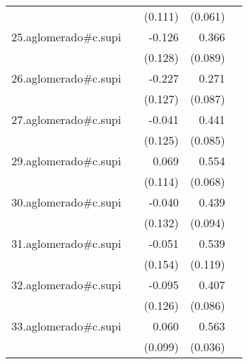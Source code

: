 {\begin{longtable}{l*{4}{D{.}{.}{-1}}}
            &                     &     (0.111)         &     (0.061)         &                     \\
\addlinespace
25.aglomerado#c.supi&                     &      -0.126         &       0.366\sym{***}&                     \\
            &                     &     (0.128)         &     (0.089)         &                     \\
\addlinespace
26.aglomerado#c.supi&                     &      -0.227         &       0.271\sym{**} &                     \\
            &                     &     (0.127)         &     (0.087)         &                     \\
\addlinespace
27.aglomerado#c.supi&                     &      -0.041         &       0.441\sym{***}&                     \\
            &                     &     (0.125)         &     (0.085)         &                     \\
\addlinespace
29.aglomerado#c.supi&                     &       0.069         &       0.554\sym{***}&                     \\
            &                     &     (0.114)         &     (0.068)         &                     \\
\addlinespace
30.aglomerado#c.supi&                     &      -0.040         &       0.439\sym{***}&                     \\
            &                     &     (0.132)         &     (0.094)         &                     \\
\addlinespace
31.aglomerado#c.supi&                     &      -0.051         &       0.539\sym{***}&                     \\
            &                     &     (0.154)         &     (0.119)         &                     \\
\addlinespace
32.aglomerado#c.supi&                     &      -0.095         &       0.407\sym{***}&                     \\
            &                     &     (0.126)         &     (0.086)         &                     \\
\addlinespace
33.aglomerado#c.supi&                     &       0.060         &       0.563\sym{***}&                     \\
            &                     &     (0.099)         &     (0.036)         &                     \\

\end{longtable}}
